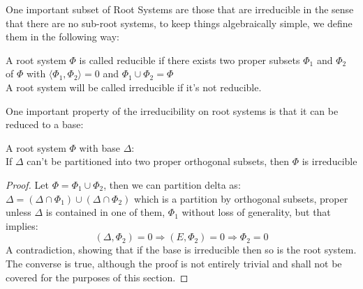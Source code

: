 One important subset of Root Systems are those that are irreducible in the sense that there are no sub-root systems, to keep things algebraically simple, we define them in the following way:
\begin{defi}
	\label{irredRS}
	A root system $\Phi$ is called reducible if there exists two proper subsets $\Phi_1$ and $\Phi_2$ of $\Phi$ with $\langle \Phi_1,\Phi_2 \rangle = 0$ and $\Phi_1 \cup \Phi_2 = \Phi$\\
	A root system will be called irreducible if it's not reducible.
\end{defi}
One important property of the irreducibility on root systems is that it can be reduced to a base:
\begin{prop}
	A root system $\Phi$ with base $\Delta$:\\
	If $\Delta$ can't be partitioned into two proper orthogonal subsets, then $\Phi$ is irreducible
	\label{irbaseimplyirroot}
\end{prop}
\begin{proof}
	Let $\Phi = \Phi_1 \cup \Phi_2$, then we can partition delta as: $\Delta = (\Delta \cap \Phi_1) \cup (\Delta \cap \Phi_2)$ which is a partition by orthogonal subsets, proper unless $\Delta$ is contained in one of them,  $\Phi_1$ without loss of generality, but that implies:
	$$(\Delta,\Phi_2) = 0 \Rightarrow (E,\Phi_2) = 0 \Rightarrow \Phi_2 = 0$$
	A contradiction, showing that if the base is irreducible then so is the root system.\\
	The converse is true, although the proof is not entirely trivial and shall not be covered for the purposes of this section.
\end{proof}